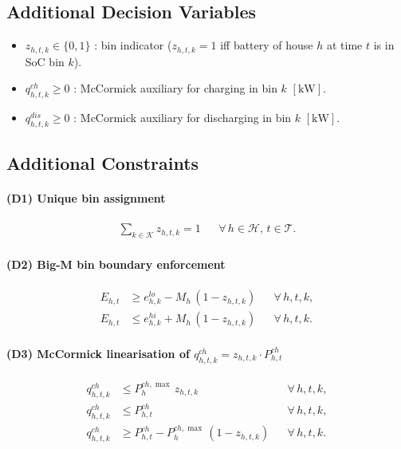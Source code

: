 \documentclass{article}
\begin{document}
\subsection{Additional Decision Variables}

\begin{itemize}
  \item $z_{h,t,k} \in \{0,1\}$
        : bin indicator ($z_{h,t,k}=1$ iff battery of house $h$ at time $t$
          is in SoC bin $k$).
  \item $q^{ch}_{h,t,k} \ge 0$
        : McCormick auxiliary for charging in bin $k$ $[\mathrm{kW}]$.
  \item $q^{dis}_{h,t,k} \ge 0$
        : McCormick auxiliary for discharging in bin $k$ $[\mathrm{kW}]$.
\end{itemize}

\subsection{Additional Constraints}

\paragraph{(D1) Unique bin assignment}
\begin{align}
  \sum_{k \in \mathcal{K}} z_{h,t,k} = 1
  && \forall\,h \in \mathcal{H},\, t \in \mathcal{T}.
  \label{eq:D1}
\end{align}

\paragraph{(D2) Big-M bin boundary enforcement}
\begin{align}
  E_{h,t} &\ge e^{lo}_{h,k} - M_h\,(1 - z_{h,t,k})
  && \forall\,h,t,k, \label{eq:D2_lo} \\
  E_{h,t} &\le e^{hi}_{h,k} + M_h\,(1 - z_{h,t,k})
  && \forall\,h,t,k. \label{eq:D2_hi}
\end{align}

\paragraph{(D3) McCormick linearisation of $q^{ch}_{h,t,k} = z_{h,t,k}\cdot P^{ch}_{h,t}$}
\begin{align}
  q^{ch}_{h,t,k} &\le P^{ch,\max}_h\,z_{h,t,k}
  && \forall\,h,t,k, \label{eq:D3_ub_bin} \\
  q^{ch}_{h,t,k} &\le P^{ch}_{h,t}
  && \forall\,h,t,k, \label{eq:D3_ub_pow} \\
  q^{ch}_{h,t,k} &\ge P^{ch}_{h,t} - P^{ch,\max}_h\,(1-z_{h,t,k})
  && \forall\,h,t,k. \label{eq:D3_lb}
\end{align}
\end{document}
